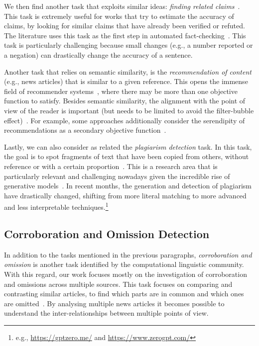 We then find another task that exploits similar ideas: \emph{finding related claims}~\citep{almeida2020text}.
This task is extremely useful for works that try to estimate the accuracy of claims, by looking for similar claims that have already been verified or refuted.
The literature uses this task as the first step in automated fact-checking~\citep{nakov2021automated,guo2022survey}.
This task is particularly challenging because small changes (e.g., a number reported or a negation) can drastically change the accuracy of a sentence.


Another task that relies on semantic similarity, is the \emph{recommendation of content} (e.g., news articles) that is similar to a given reference.
This opens the immense field of recommender systems~\citep{tintarev2006similarity,karimi2018news,feng2020news}, where there may be more than one objective function to satisfy.
Besides semantic similarity, the alignment with the point of view of the reader is important (but needs to be limited to avoid the filter-bubble effect)~\citep{lunardi2020metric,nguyen2014exploring,lunardi2019representing}.
For example, some approaches additionally consider the serendipity of recommendations as a secondary objective function~\citep{ziarani2021serendipity,abdollahpouri2021toward,raza2022news}.

Lastly, we can also consider as related the \emph{plagiarism detection} task.
In this task, the goal is to spot fragments of text that have been copied from others, without reference or with a certain proportion~\citep{stein2006near,alzahrani2010fuzzy,arabi2022improving}.
This is a research area that is particularly relevant and challenging nowadays given the incredible rise of generative models~\cite{openai2023gpt4}.
In recent months, the generation and detection of plagiarism have drastically changed, shifting from more literal matching to more advanced and less interpretable techniques.\footnote{e.g., \url{https://gptzero.me/} and \url{https://www.zerogpt.com/}}


\subsection{\statusgreen Corroboration and Omission Detection}
\label{ssec:lit_relationships_corr_omiss}

In addition to the tasks mentioned in the previous paragraphs,
\textit{corroboration and omission}
is another task identified by the computational linguistic community.
With this regard, our work focuses mostly on the investigation of corroboration and omissions
across multiple sources.
This task focuses on comparing and contrasting similar articles, to find which parts are in common and which ones are omitted~\cite{ehrhardt2021omission,bountouridis2018explaining,ko2023claimdiff}.
By analysing multiple news articles it becomes possible to understand the inter-relationships between multiple points of view.

